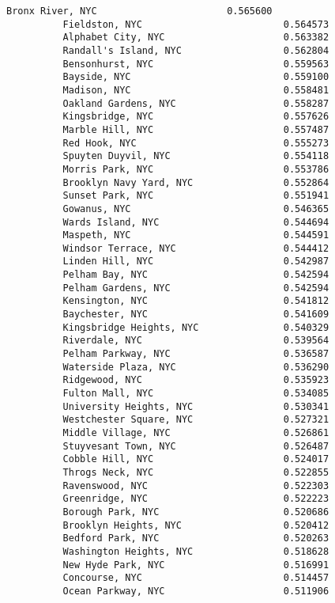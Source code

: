 \documentclass[11pt]{article}
\begin{document}
\begin{Verbatim}[commandchars=\\\{\}]
          Bronx River, NYC                       0.565600
          Fieldston, NYC                         0.564573
          Alphabet City, NYC                     0.563382
          Randall's Island, NYC                  0.562804
          Bensonhurst, NYC                       0.559563
          Bayside, NYC                           0.559100
          Madison, NYC                           0.558481
          Oakland Gardens, NYC                   0.558287
          Kingsbridge, NYC                       0.557626
          Marble Hill, NYC                       0.557487
          Red Hook, NYC                          0.555273
          Spuyten Duyvil, NYC                    0.554118
          Morris Park, NYC                       0.553786
          Brooklyn Navy Yard, NYC                0.552864
          Sunset Park, NYC                       0.551941
          Gowanus, NYC                           0.546365
          Wards Island, NYC                      0.544694
          Maspeth, NYC                           0.544591
          Windsor Terrace, NYC                   0.544412
          Linden Hill, NYC                       0.542987
          Pelham Bay, NYC                        0.542594
          Pelham Gardens, NYC                    0.542594
          Kensington, NYC                        0.541812
          Baychester, NYC                        0.541609
          Kingsbridge Heights, NYC               0.540329
          Riverdale, NYC                         0.539564
          Pelham Parkway, NYC                    0.536587
          Waterside Plaza, NYC                   0.536290
          Ridgewood, NYC                         0.535923
          Fulton Mall, NYC                       0.534085
          University Heights, NYC                0.530341
          Westchester Square, NYC                0.527321
          Middle Village, NYC                    0.526861
          Stuyvesant Town, NYC                   0.526487
          Cobble Hill, NYC                       0.524017
          Throgs Neck, NYC                       0.522855
          Ravenswood, NYC                        0.522303
          Greenridge, NYC                        0.522223
          Borough Park, NYC                      0.520686
          Brooklyn Heights, NYC                  0.520412
          Bedford Park, NYC                      0.520263
          Washington Heights, NYC                0.518628
          New Hyde Park, NYC                     0.516991
          Concourse, NYC                         0.514457
          Ocean Parkway, NYC                     0.511906

\end{Verbatim}
\end{document}
